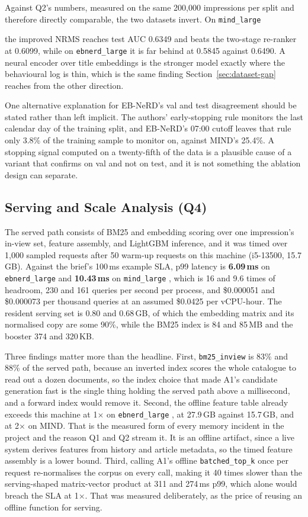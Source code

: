 \documentclass[11pt]{article}
\newcommand{\code}[1]{%
    \colorbox{gray!40}{\texttt{#1}}%
}
\begin{document}
Against Q2's numbers, measured on the same 200,000 impressions per split and
therefore directly comparable, the two datasets invert. On \code{mind\_large}
the improved NRMS reaches test AUC 0.6349 and beats the two-stage re-ranker at
0.6099, while on \code{ebnerd\_large} it is far behind at 0.5845 against
0.6490. A neural encoder over title embeddings is the stronger model exactly
where the behavioural log is thin, which is the same finding
Section~\ref{sec:dataset-gap} reaches from the other direction.

One alternative explanation for EB-NeRD's val and test disagreement should be
stated rather than left implicit. The authors' early-stopping rule monitors
the last calendar day of the training split, and EB-NeRD's 07:00 cutoff leaves
that rule only 3.8\% of the training sample to monitor on, against MIND's
25.4\%. A stopping signal computed on a twenty-fifth of the data is a
plausible cause of a variant that confirms on val and not on test, and it is
not something the ablation design can separate.

\subsection{Serving and Scale Analysis (Q4)}
\label{sec:serving}

The served path consists of BM25 and embedding scoring over one impression's
in-view set, feature assembly, and LightGBM inference, and it was timed over
1,000 sampled requests after 50 warm-up requests on this machine (i5-13500,
15.7\,GB). Against the brief's 100\,ms example SLA, p99 latency is
\textbf{6.09\,ms} on \code{ebnerd\_large} and \textbf{10.43\,ms} on
\code{mind\_large}, which is 16 and 9.6 times of headroom, 230 and 161 queries
per second per process, and \$0.000051 and \$0.000073 per thousand queries at
an assumed \$0.0425 per vCPU-hour. The resident serving set is 0.80 and
0.68\,GB, of which the embedding matrix and its normalised copy are some 90\%,
while the BM25 index is 84 and 85\,MB and the booster 374 and 320\,KB.

Three findings matter more than the headline. First, \code{bm25\_inview} is
83\% and 88\% of the served path, because an inverted index scores the whole
catalogue to read out a dozen documents, so the index choice that made A1's
candidate generation fast is the single thing holding the served path above a
millisecond, and a forward index would remove it. Second, the offline feature
table already exceeds this machine at 1$\times$ on \code{ebnerd\_large}, at
27.9\,GB against 15.7\,GB, and at 2$\times$ on MIND. That is the measured form
of every memory incident in the project and the reason Q1 and Q2 stream it. It
is an offline artifact, since a live system derives features from history and
article metadata, so the timed feature assembly is a lower bound. Third,
calling A1's offline \code{batched\_top\_k} once per request re-normalises the
corpus on every call, making it 40 times slower than the serving-shaped
matrix-vector product at 311 and 274\,ms p99, which alone would breach the SLA
at 1$\times$. That was measured deliberately, as the price of reusing an
offline function for serving.
\end{document}

